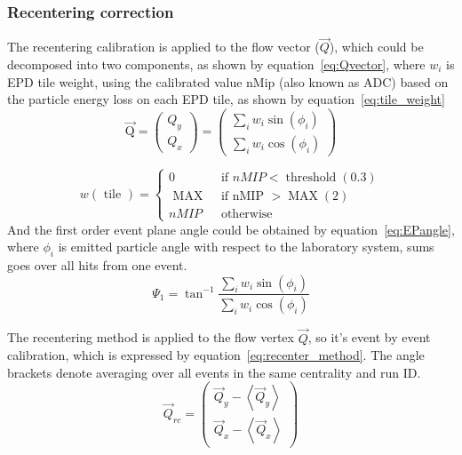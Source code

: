 \subsubsection{Recentering correction}
The recentering calibration is applied to the flow vector ($\vec{Q}$), which could be decomposed into 
two components, as shown by equation~\ref{eq:Qvector}, where $w_i$ is EPD tile weight, using the
calibrated value nMip (also known as ADC) based on the particle energy loss on each EPD tile, as shown by equation~\ref{eq:tile_weight}
\begin{equation}
    \overrightarrow{\mathrm{Q}}=\left(\begin{array}{l}
    Q_y \\
    Q_x
    \end{array}\right)=\left(\begin{array}{c}
    \sum_i w_i \sin (\phi_i) \\
    \sum_i w_i \cos (\phi_i)
    \end{array}\right)
\label{eq:Qvector}
\end{equation}

\begin{equation}
    w(\text { tile })= \begin{cases}0 & \text { if } n M I P<\operatorname{threshold}(0.3) \\ \text { MAX } & \text { if nMIP }>\operatorname{MAX}(2) \\ n M I P & \text { otherwise }\end{cases}
\label{eq:tile_weight}
\end{equation}
And the first order event plane angle could be obtained by equation~\ref{eq:EPangle}, where $\phi_i$ is emitted particle angle 
with respect to the laboratory system, sums goes over all hits from one event.
\begin{equation}
    \Psi_1=\tan ^{-1} \frac{\sum_i w_i \sin \left(\phi_i\right)}{\sum_i w_i \cos \left(\phi_i\right)}
\label{eq:EPangle}
\end{equation}

The recentering method is applied to the flow vertex $\vec{Q}$, so it's event by event calibration,
which is expressed by equation~\ref{eq:recenter_method}. The angle brackets denote averaging over all events
in the same centrality and run ID.
\begin{equation}
    \vec{Q}_{r c}=\left(\begin{array}{l}
    \vec{Q}_y-\left\langle\vec{Q}_y\right\rangle \\
    \vec{Q}_x-\left\langle\vec{Q}_x\right\rangle
    \end{array}\right)
\label{eq:recenter_method}
\end{equation}

